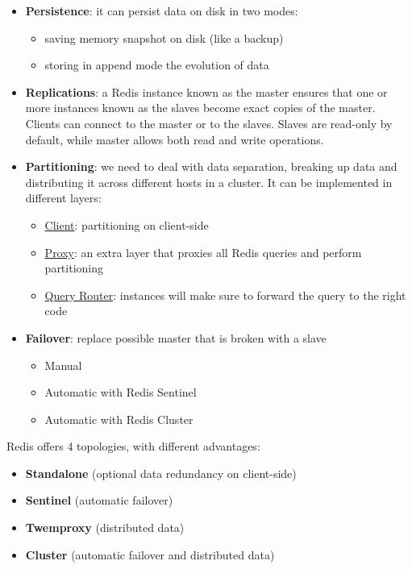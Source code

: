 \documentclass[10pt,a4paper]{article}
\begin{document}
\begin{itemize}
	\item \textbf{Persistence}: it can persist data on disk in two modes:
	\begin{itemize}
		\item saving memory snapshot on disk (like a backup)
		\item storing in append mode the evolution of data
	\end{itemize}

	\item \textbf{Replications}: a Redis instance known as the master ensures that one or more instances known as the slaves become exact copies of the master. Clients can connect to the master or to the slaves. Slaves are read-only by default, while master allows both read and write operations.
	\item \textbf{Partitioning}: we need to deal with data separation, breaking up data and distributing it across different hosts in a cluster. It can be implemented in different layers:
	\begin{itemize}
		\item \uline{Client}: partitioning on client-side
		\item \uline{Proxy}: an extra layer that proxies all Redis queries and perform partitioning
		\item \uline{Query Router}: instances will make sure to forward the query to the right code
	\end{itemize}

	\item \textbf{Failover}: replace possible master that is broken with a slave
	\begin{itemize}
		\item Manual
		\item Automatic with Redis Sentinel
		\item Automatic with Redis Cluster
	\end{itemize}

\end{itemize}
Redis offers 4 topologies, with different advantages:
\begin{itemize}
	\item \textbf{Standalone} (optional data redundancy on client-side)
	\item \textbf{Sentinel} (automatic failover)
	\item \textbf{Twemproxy} (distributed data)
	\item \textbf{Cluster} (automatic failover and distributed data)
\end{itemize}
\end{document}
